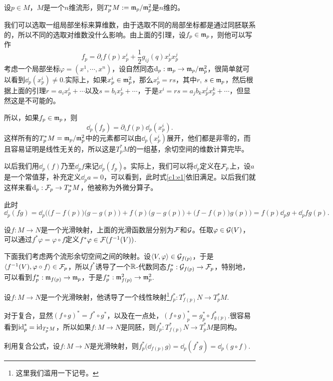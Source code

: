 \para 设$p\in M$，$M$是一个$n$维流形，则$T_p^*M:=\mathfrak{m}_p/\mathfrak{m}_p^2$是$n$维的。

我们可以选取一组局部坐标来算维数，由于选取不同的局部坐标都是通过同胚联系的，所以不同的选取对维数没什么影响。由上面的引理，设$f_p\in \mathfrak{m}_p$，则他可以写作
\[
	f_p=\partial_i f(p)x^i_p+\frac{1}{2}g_{ij}(q)x^i_px^j_p
\]
考虑一个局部坐标$\varphi=(x^1,\cdots,x^n)$，设自然同态$\mathrm{d}_p:\mathfrak{m}_p\to \mathfrak{m}_p/\mathfrak{m}_p^2$，很简单就可以看到$\dd_p(x^i_p)\neq 0$.实际上，如果$x^i_p\in \mathfrak{m}_p^2$，那么$x^i_p=rs$，其中$r$, $s\in \mathfrak{m}_p$，然后根据上面的引理$r=a_ix^i_p+\cdots$以及$s=b_ix^i_p+\cdots$，于是$x^i=rs=a_jb_kx^j_px^k_p+\cdots$，但显然这是不可能的。

所以，如果$f_p\in \mathfrak{m}_p$，则
\begin{equation}
\label{c1:e1}
	\dd_p(f_p)=\partial_i f(p)\dd_p(x^i_p).
\end{equation}
这样所有的$T_p^*M=\mathfrak{m}_p/\mathfrak{m}_p^2$中的元素都可以由$\dd_p(x^i_p)$展开，他们都是非零的，而且容易证明是线性无关的，所以这是$T_p^*M$的一组基，余切空间的维数计算完毕。

以后我们用$\dd_p(f)$乃至$\dd_pf$来记$\dd_p(f_p)$。实际上，我们可以将$\dd_p$定义在$\mathcal{F}_p$上，设$a$是一个常值芽，补充定义$\dd_pa=0$，可以看到，此时式\eqref{c1:e1}依旧满足。以后我们就这样来看$\mathrm{d}_p:\mathcal{F}_p\to T_p^*M$，他被称为{\kaishu 外微分}算子。

\para 此时\[\dd_p (fg)=\dd_p\bigl(\bigl(f-f(p)\bigr)\bigl(g-g(p)\bigr)+f(p)\bigl(g-g(p)\bigr)+\bigl(f-f(p)\bigr)g(p)\bigr)=f(p)\dd_pg+\dd_pf g(p).\]

\para 设$f:M\to N$是一个光滑映射，上面的光滑函数层分别为$\mathcal{F}$和$\mathcal{G}$。任取$\varphi\in \mathcal{G}(V)$，可以通过$f^*\varphi=\varphi\circ f$定义$f^*\varphi\in \mathcal{F}(f^{-1}(V))$.

下面我们考虑两个流形余切空间之间的映射。设$\langle V,\varphi\rangle\in \mathcal{G}_{f(p)}$，于是$\langle f^{-1}(V),\varphi\circ f\rangle\in \mathcal{F}_p$，所以$f^*$诱导了一个$\mathbb{R}$-代数同态$f^*_p:\mathcal{G}_{f(p)}\to \mathcal{F}_p$，特别地，可以看到$f^*_p:\mathfrak{m}_{f(p)}\to \mathfrak{m}_{p}$，于是$f^*_p:\mathfrak{m}^2_{f(p)}\to \mathfrak{m}^2_{p}$.

\para 设$f:M\to N$是一个光滑映射，他诱导了一个线性映射\footnote{这里我们滥用一下记号。}$f^*_p:T_{f(p)}^*N\to T_p^*M$.

\para 对于复合，显然$(f\circ g)^*=f^*\circ g^*$，以及在一点处，$(f\circ g)^*_p=g^*_p\circ f^*_{g(p)}$.很容易看到$\operatorname{id}^*_p=\operatorname{id}_{T_p^*M}$，所以如果$f:M\to N$是同胚，则$f_p^*:T_{f(p)}^*N\to T_p^*M$是同构。

\para \label{f*d=df*}利用复合公式，设$f:M\to N$是光滑映射，则$f^*_p\bigl(\dd_{f(p)}g\bigr)=\dd_{p}(f^*g)=\dd_p(g\circ f)$.

